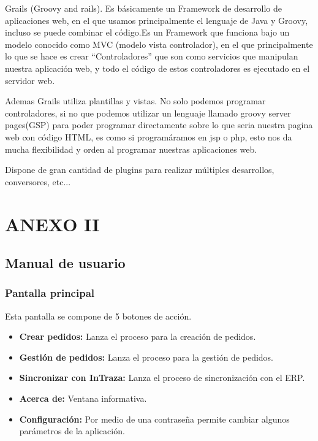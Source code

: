 Grails (Groovy and rails). Es básicamente un Framework de desarrollo de aplicaciones web, en el que usamos principalmente el lenguaje de Java y Groovy, incluso se puede combinar el código.Es un Framework que funciona bajo un modelo conocido como MVC (modelo vista controlador), en el que principalmente lo que se hace es crear “Controladores” que son como servicios que manipulan nuestra aplicación web, y todo el código de estos controladores es ejecutado en el servidor web.

Ademas Grails utiliza plantillas y vistas. No solo podemos programar controladores, si no que podemos utilizar un lenguaje llamado groovy server pages(GSP) para poder programar directamente sobre lo que seria nuestra pagina web con código HTML, es como si programáramos en jsp o php, esto nos da mucha flexibilidad y orden al programar nuestras aplicaciones web. 

Dispone de gran cantidad de plugins para realizar múltiples desarrollos, conversores, etc...

\chapter{ANEXO II}
\section{Manual de usuario}

\subsection{Pantalla principal}

Esta pantalla se compone de 5 botones de acción.

\begin{itemize}
	\item \textbf{Crear pedidos:} Lanza el proceso para la creación de pedidos.
	\item \textbf{Gestión de pedidos:} Lanza el proceso para la gestión de pedidos.
	\item \textbf{Sincronizar con InTraza:} Lanza el proceso de sincronización con el ERP.
	\item \textbf{Acerca de:} Ventana informativa.
	\item \textbf{Configuración:} Por medio de una contraseña permite cambiar algunos parámetros de la aplicación.
					
\end{itemize}

